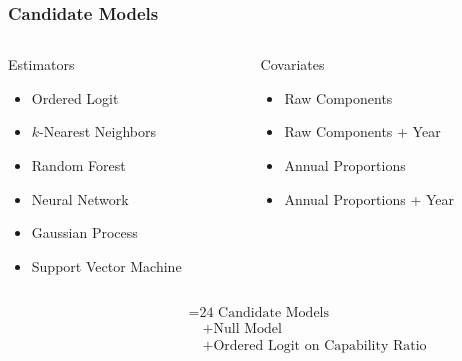 \documentclass[10pt]{beamer}
\begin{document}
\begin{frame}
  \frametitle{Candidate Models}

  \begin{columns}[t]
    \begin{column}{0.45\textwidth}
      \begin{block}{Estimators}
        \begin{itemize}
          \item Ordered Logit
          \item $k$-Nearest Neighbors
          \item Random Forest
          \item Neural Network
          \item Gaussian Process
          \item Support Vector Machine
        \end{itemize}
      \end{block}
    \end{column}

    \begin{column}{0.45\textwidth}
      \begin{block}{Covariates}
        \begin{itemize}
          \item Raw Components
          \item Raw Components + Year
          \item Annual Proportions
          \item Annual Proportions + Year
        \end{itemize}
      \end{block}
    \end{column}
  \end{columns}

  \vspace{-2em}
  \begin{align*}
    \qquad\qquad\qquad
    &= \text{24 Candidate Models} \\
    &\quad + \text{Null Model} \\
    &\quad + \text{Ordered Logit on Capability Ratio}
  \end{align*}
\end{frame}
\end{document}
